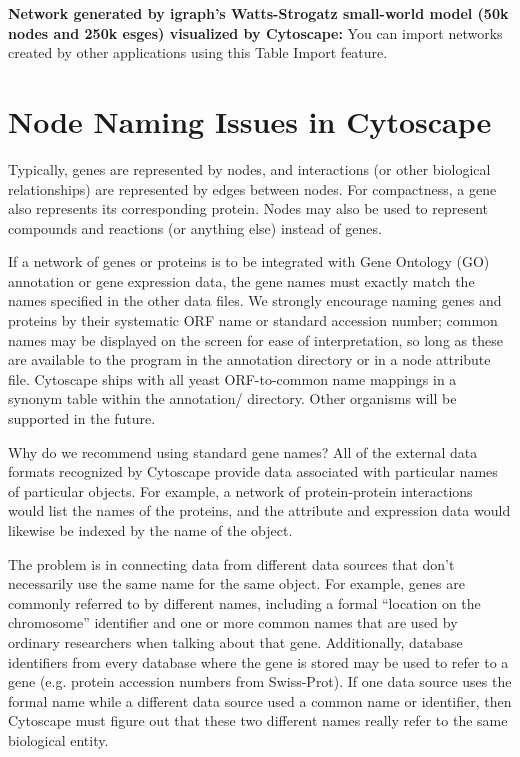  \textbf{Network generated by igraph's Watts-Strogatz small-world model (50k nodes and 250k esges) visualized by Cytoscape:}
 You can import networks created by other applications using this Table Import feature. 
 
\section{Node Naming Issues in Cytoscape}

 Typically, genes are represented by nodes, and interactions (or other biological relationships) are represented by edges between nodes. For compactness, a gene also represents its corresponding protein. Nodes may also be used to represent compounds and reactions (or anything else) instead of genes. 

 If a network of genes or proteins is to be integrated with Gene Ontology (GO) annotation or gene expression data, the gene names must exactly match the names specified in the other data files. We strongly encourage naming genes and proteins by their systematic ORF name or standard accession number; common names may be displayed on the screen for ease of interpretation, so long as these are available to the program in the annotation directory or in a node attribute file. Cytoscape ships with all yeast ORF-to-common name mappings in a synonym table within the annotation/ directory. Other organisms will be supported in the future. 

 Why do we recommend using standard gene names? All of the external data formats recognized by Cytoscape provide data associated with particular names of particular objects. For example, a network of protein-protein interactions would list the names of the proteins, and the attribute and expression data would likewise be indexed by the name of the object. 

 The problem is in connecting data from different data sources that don't necessarily use the same name for the same object. For example, genes are commonly referred to by different names, including a formal ``location on the chromosome'' identifier and one or more common names that are used by ordinary researchers when talking about that gene. Additionally, database identifiers from every database where the gene is stored may be used to refer to a gene (e.g. protein accession numbers from Swiss-Prot). If one data source uses the formal name while a different data source used a common name or identifier, then Cytoscape must figure out that these two different names really refer to the same biological entity. 

